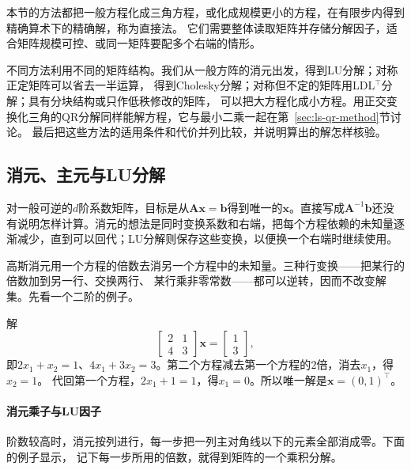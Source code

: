 本节的方法都把一般方程化成三角方程，或化成规模更小的方程，在有限步内得到精确算术下的精确解，称为直接法。
它们需要整体读取矩阵并存储分解因子，适合矩阵规模可控、或同一矩阵要配多个右端的情形。

不同方法利用不同的矩阵结构。我们从一般方阵的消元出发，得到LU分解；对称正定矩阵可以省去一半运算，
得到Cholesky分解；对称但不定的矩阵用LDL$^{\top}$分解；具有分块结构或只作低秩修改的矩阵，
可以把大方程化成小方程。用正交变换化三角的QR分解同样能解方程，它与最小二乘一起在第~\ref{sec:ls-qr-method}节讨论。
最后把这些方法的适用条件和代价并列比较，并说明算出的解怎样核验。

\subsection{消元、主元与LU分解}

对一般可逆的$d$阶系数矩阵，目标是从$\bm A\bm x=\bm b$得到唯一的$\bm x$。直接写成$\bm A^{-1}\bm b$还没有说明怎样计算。消元的想法是同时变换系数和右端，把每个方程依赖的未知量逐渐减少，直到可以回代；LU分解则保存这些变换，以便换一个右端时继续使用。

高斯消元用一个方程的倍数去消另一个方程中的未知量。三种行变换——把某行的倍数加到另一行、交换两行、
某行乘非零常数——都可以逆转，因而不改变解集。先看一个二阶的例子。

\begin{example}[二阶方程的消元]
\label{ex:ls-elimination-two-by-two}
解
\[
 \begin{bmatrix}2&1\\4&3\end{bmatrix}\bm x=\begin{bmatrix}1\\3\end{bmatrix},
\]
即$2x_1+x_2=1$、$4x_1+3x_2=3$。第二个方程减去第一个方程的$2$倍，消去$x_1$，得$x_2=1$。
代回第一个方程，$2x_1+1=1$，得$x_1=0$。所以唯一解是$\bm x=(0,1)^\top$。
\end{example}

\paragraph{消元乘子与LU因子}

阶数较高时，消元按列进行，每一步把一列主对角线以下的元素全部消成零。下面的例子显示，
记下每一步所用的倍数，就得到矩阵的一个乘积分解。

